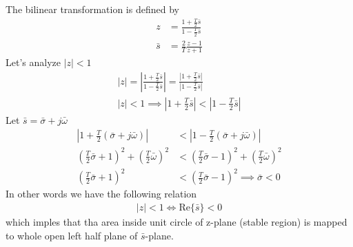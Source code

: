 \documentclass[twoside]{article}
\begin{document}
The bilinear transformation is defined by
%
\begin{align*}
 z &= \frac{1+\frac{T}{2} \bar{s}}{1-\frac{T}{2} \bar{s}} \\
 \bar{s} &= \frac{2}{T} \frac{z-1}{z+1}
\end{align*}
%
Let's analyze $|z| < 1$ 
%
\begin{align*}
|z| = \left| \frac{1+\frac{T}{2} \bar{s}}{1-\frac{T}{2} \bar{s}}
  \right| = \frac{| 1+\frac{T}{2} \bar{s} |}{| 1-\frac{T}{2} \bar{s}|
  }
\\
|z| < 1 \implies \left| 1+\frac{T}{2} \bar{s} \right| < \left|
  1-\frac{T}{2} \bar{s} \right|
\end{align*}
%
Let $\bar{s} = \bar{\sigma} + j \bar{\omega}$
%
\begin{align*}
\left| 1+\frac{T}{2} ( \bar{\sigma} + j \bar{\omega} ) \right| &<
  \left| 1-\frac{T}{2} ( \bar{\sigma} + j \bar{\omega} ) \right|
\\
\left( \frac{T}{2} \bar{\sigma} + 1 \right)^2 + \left( \frac{T}{2} \bar{\omega} \right)^2 
&<
\left( \frac{T}{2} \bar{\sigma} - 1 \right)^2 + \left( \frac{T}{2}
  \bar{\omega} \right)^2 
\\
\left( \frac{T}{2} \bar{\sigma} + 1 \right)^2 
&<
\left( \frac{T}{2} \bar{\sigma} - 1 \right)^2 \implies \bar{\sigma} < 0
\end{align*}
%
In other words we have the following relation 
%
\begin{align*}
  | z | < 1 \iff \mathrm{Re} \lbrace \bar{s}  \rbrace < 0
\end{align*}
%
which imples that tha area inside unit circle of z-plane (stable
region) is mapped to whole open left half plane of $\bar{s}$-plane.
\end{document}
